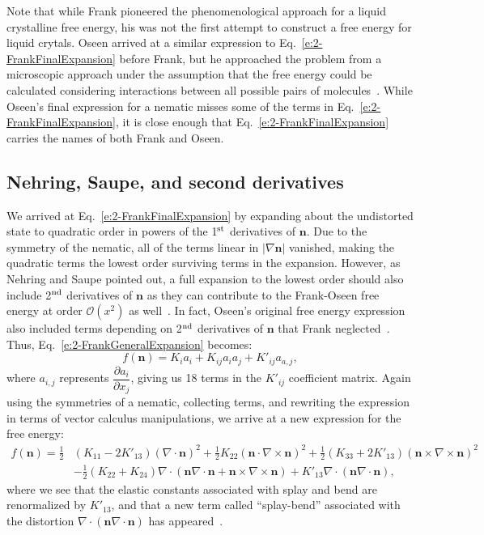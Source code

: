 Note that while Frank pioneered the phenomenological approach for a liquid crystalline free energy, his was not the first attempt to construct a free energy for liquid crytals.
Oseen arrived at a similar expression to Eq.~\ref{e:2-FrankFinalExpansion} before Frank, but he approached the problem from a microscopic approach under the assumption that the free energy could be calculated considering interactions between all possible pairs of molecules~\cite{RN205}.
While Oseen's final expression for a nematic misses some of the terms in Eq.~\ref{e:2-FrankFinalExpansion}, it is close enough that Eq.~\ref{e:2-FrankFinalExpansion} carries the names of both Frank and Oseen.


\subsection{Nehring, Saupe, and second derivatives}
We arrived at Eq.~\ref{e:2-FrankFinalExpansion} by expanding about the undistorted state to quadratic order in powers of the 1$^\textup{\rm st}$ derivatives of $\mathbf{n}$.
Due to the symmetry of the nematic, all of the terms linear in $|\nabla \mathbf{n}|$ vanished, making the quadratic terms the lowest order surviving terms in the expansion.
However, as Nehring and Saupe pointed out, a full expansion to the lowest order should also include 2$^\textup{\rm nd}$ derivatives of $\mathbf{n}$ as they can contribute to the Frank-Oseen free energy at order $\mathcal{O}(x^2)$ as well~\cite{RN60}.
In fact, Oseen's original free energy expression also included terms depending on 2$^\textup{\rm nd}$ derivatives of $\mathbf{n}$ that Frank neglected~\cite{RN205}.
Thus, Eq.~\ref{e:2-FrankGeneralExpansion} becomes:
\begin{equation}
  f(\mathbf{n}) = K_i a_i + K_{ij} a_i a_j + K'_{ij} a_{a,j},\label{e:2-NSGeneralExpansion}
\end{equation}
where $a_{i,j}$ represents $\dfrac{\partial a_i}{\partial x_j}$, giving us 18 terms in the $K'_{ij}$ coefficient matrix.
Again using the symmetries of a nematic, collecting terms, and rewriting the expression in terms of vector calculus manipulations, we arrive at a new expression for the free energy:
\begin{align}
  f(\mathbf{n}) = \frac{1}{2}&(K_{11} - 2K'_{13}) (\nabla \cdot \mathbf{n})^2 + \frac{1}{2}K_{22} (\mathbf{n} \cdot \nabla \times \mathbf{n})^2 + \frac{1}{2}(K_{33} + 2K'_{13}) (\mathbf{n} \times \nabla \times \mathbf{n})^2 \nonumber \\
    & - \frac{1}{2}(K_{22} + K_{24}) \nabla \cdot (\mathbf{n}\nabla \cdot \mathbf{n} + \mathbf{n} \times \nabla \times \mathbf{n})
      + K'_{13} \nabla \cdot (\mathbf{n} \nabla \cdot \mathbf{n}),\label{e:2-NSFinalExpansion}
\end{align}
where we see that the elastic constants associated with splay and bend are renormalized by $K'_{13}$, and that a new term called ``splay-bend'' associated with the distortion $\nabla \cdot (\mathbf{n} \nabla \cdot \mathbf{n})$ has appeared~\cite{RN60}. \\


